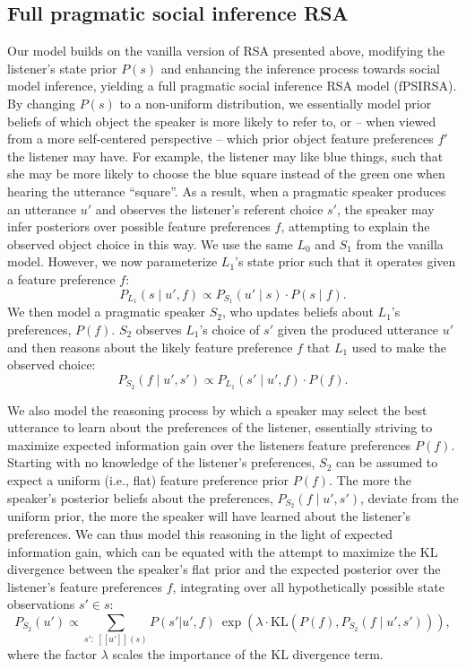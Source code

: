 \documentclass[10pt,a4paper]{article}
\newcommand{\gcs}[1]{\textcolor{blue}{[gcs: #1]}}
\begin{document}
\subsection{Full pragmatic social inference RSA}
Our model builds on the vanilla version of RSA presented above, modifying the listener's state prior $P(s)$ and enhancing the inference process towards social model inference, yielding a full pragmatic social inference RSA model (fPSIRSA). %
By changing $P(s)$ to a non-uniform distribution, we essentially model prior beliefs of which object the speaker is more likely to refer to, or -- when viewed from a more self-centered perspective -- which prior object feature preferences $f'$ the listener may have. 
For example, the listener may like blue things, such that she may be more likely to choose the blue square instead of the green one when hearing the utterance ``square''.
As a result, when a pragmatic speaker produces an utterance $u'$ and observes the listener's referent choice $s'$, the speaker may infer posteriors over possible feature preferences $f$, attempting to explain the observed object choice in this way.
We use the same $L_0$ and $S_1$ from the vanilla model.
However, we now parameterize $L_1$'s state prior such that it operates given a feature preference $f$:
$$P_{L_{1}}(s\mid u',f) \propto P_{S_{1}}(u' \mid s) \cdot P(s \mid f).$$
We then model a pragmatic speaker $S_2$, who updates beliefs about $L_1$'s preferences, $P(f)$.
$S_2$ observes $L_1$'s choice of $s'$ given the produced utterance $u'$ and then reasons about the likely feature preference $f$ that $L_1$ used to make the observed choice:
$$P_{S_{2}}(f\mid u',s') \propto P_{L_{1}}(s'\mid u',f) \cdot P(f).$$

We also model the reasoning process by which a speaker may select the best utterance to learn about the preferences of the listener, essentially striving to maximize expected information gain over the listeners feature preferences $P(f)$.
Starting with no knowledge of the listener's preferences, $S_2$ can be assumed to expect a uniform (i.e., flat) feature preference prior $P(f)$.
The more the speaker's posterior beliefs about the preferences, $P_{S_{2}}(f\mid u',s')$, deviate from the uniform prior, the more the speaker will have learned about the listener's preferences. 
We can thus model this reasoning in the light of expected information gain, which can be equated with the attempt to maximize the KL divergence between the speaker's flat prior and the expected posterior over the listener's feature preferences $f$, integrating over all hypothetically possible state observations $s' \in s$: %
$$P_{S_2}(u') \propto \sum_{s':\  [\![u']\!](s)} P(s'|u',f)\ \exp(\lambda \cdot \textrm{KL}(P(f),P_{S_{2}}(f\mid u',s'))),$$
where the factor $\lambda$ scales the importance of the KL divergence term. 
\end{document}

